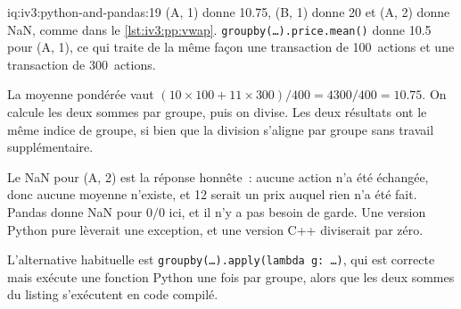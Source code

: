 \begin{solution}{iq:iv3:python-and-pandas:19}
(A, 1) donne 10.75, (B, 1) donne 20 et (A, 2) donne NaN, comme dans le \cref{lst:iv3:pp:vwap}. \texttt{groupby(\dots).price.mean()} donne 10.5 pour (A, 1), ce qui traite de la même façon une transaction de 100~actions et une transaction de 300~actions.
\label{lst:iv3:pp:vwap}

La moyenne pondérée vaut $(10 \times 100 + 11 \times 300) / 400 = 4300 / 400 = 10.75$. On calcule les deux sommes par groupe, puis on divise. Les deux résultats ont le même indice de groupe, si bien que la division s'aligne par groupe sans travail supplémentaire.

Le NaN pour (A, 2) est la réponse honnête~: aucune action n'a été échangée, donc aucune moyenne n'existe, et 12 serait un prix auquel rien n'a été fait. Pandas donne NaN pour $0 / 0$ ici, et il n'y a pas besoin de garde. Une version Python pure lèverait une exception, et une version C++ diviserait par zéro.

L'alternative habituelle est \texttt{groupby(\dots).apply(lambda g: \dots)}, qui est correcte mais exécute une fonction Python une fois par groupe, alors que les deux sommes du listing s'exécutent en code compilé.

\end{solution}

